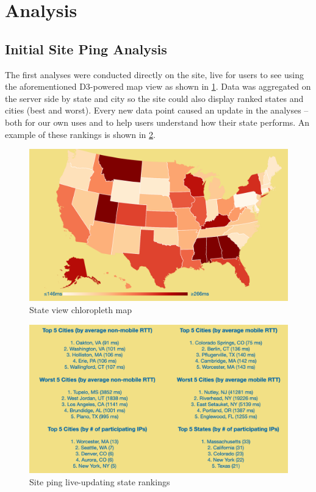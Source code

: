 \section{Analysis}\label{sec:results_web_ping}
\subsection{Initial Site Ping Analysis}

The first analyses were conducted directly on the site, live for users to see using the aforementioned D3-powered map view as shown in \cref{fig:siteping_state_view}. Data was aggregated on the server side by state and city so the site could also display ranked states and cities (best and worst). Every new data point caused an update in the analyses -- both for our own uses and to help users understand how their state performs. An example of these rankings is shown in \cref{fig:siteping_rankings}.

\begin{figure}
    \centering
    \includegraphics[width=\textwidth]{images/siteping/Siteping_state_map.png}
    \caption{State view chloropleth map}
    \label{fig:siteping_state_view}
\end{figure}

\begin{figure}[h]
    \centering
    \includegraphics{images/siteping/Sitping_Rankings.png}
    \caption{Site ping live-updating state rankings}
    \label{fig:siteping_rankings}
\end{figure}

